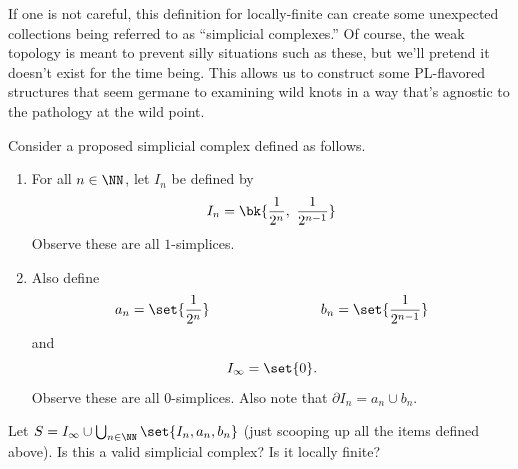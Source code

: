If one is not careful, this definition for locally-finite can create
some unexpected collections being referred to as ``simplicial
complexes.'' Of course, the weak topology is meant to prevent
silly situations such as these, but we'll pretend it doesn't exist for
the time being. This allows us to construct some PL-flavored
structures that seem germane to examining wild knots in a way that's
agnostic to the pathology at the wild point.
\begin{example}\label{ex:locally-finite-problem}
  Consider a proposed simplicial complex defined as follows.
  \begin{leftbar}
    \begin{enumerate}
      \item For all $n \in \NN$, let $I_n$ be defined by
        \[
        I_n = \bk{\frac{1}{2^n},\ \frac{1}{2^{n-1}}}
        \]
        Observe these are all $1$-simplices.
      \item Also define
        \[
        a_n = \set{\frac{1}{2^n}} \qquad\qquad\qquad\qquad b_n =
        \set{\frac{1}{2^{n-1}}}
        \]
        and
        \[
        I_\infty = \set{0}.
        \]
        Observe these are all $0$-simplices. Also note that $\partial
        I_n = a_n \cup b_n$.
    \end{enumerate}
    Let $S = I_\infty \cup \bigcup_{n \in \NN} \set{I_n, a_n, b_n}$
    (just scooping up all the items defined above). Is this a valid
    simplicial complex? Is it locally finite? \qedhere
  \end{leftbar}
\end{example}

